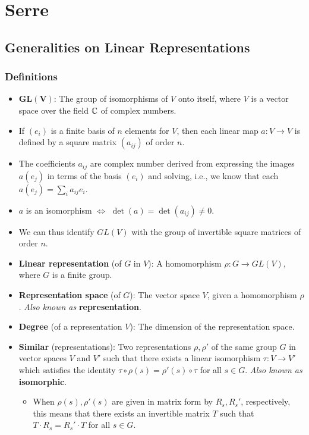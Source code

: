 \documentclass[../notes.tex]{subfiles}
\begin{document}
\part{Serre}
\chapter{Generalities on Linear Representations}
\section{Definitions}
\begin{itemize}
    \item {}$\bm{GL(V)}$: The group of isomorphisms of $V$ onto itself, where $V$ is a vector space over the field $\mathbb{C}$ of complex numbers.
    \item If $(e_i)$ is a finite basis of $n$ elements for $V$, then each linear map $a:V\to V$ is defined by a square matrix $(a_{ij})$ of order $n$.
    \item The coefficients $a_{ij}$ are complex number derived from expressing the images $a(e_j)$ in terms of the basis $(e_i)$ and solving, i.e., we know that each $a(e_j)=\sum_ia_{ij}e_i$.
    \item $a$ is an isomorphism $\Longleftrightarrow$ $\det(a)=\det(a_{ij})\neq 0$.
    \item We can thus identify $GL(V)$ with the group of invertible square matrices of order $n$.
    \item \textbf{Linear representation} (of $G$ in $V$): A homomorphism $\rho:G\to GL(V)$, where $G$ is a finite group.
    \item \textbf{Representation space} (of $G$): The vector space $V$, given a homomorphism $\rho$. \emph{Also known as} \textbf{representation}.
    \item \textbf{Degree} (of a representation $V$): The dimension of the representation space.
    \item \textbf{Similar} (representations): Two representations $\rho,\rho'$ of the same group $G$ in vector spaces $V$ and $V'$ such that there exists a linear isomorphism $\tau:V\to V'$ which satisfies the identity $\tau\circ\rho(s)=\rho'(s)\circ\tau$ for all $s\in G$. \emph{Also known as} \textbf{isomorphic}.
    \begin{itemize}
        \item When $\rho(s),\rho'(s)$ are given in matrix form by $R_s,R_s'$, respectively, this means that there exists an invertible matrix $T$ such that $T\cdot R_s=R_s'\cdot T$ for all $s\in G$.
    \end{itemize}
\end{itemize}
\end{document}
